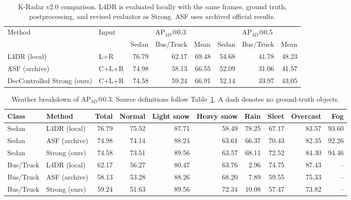 \begin{table}[t]
\centering
\small
\caption{K-Radar v2.0 comparison. L4DR is evaluated locally with the same frames, ground truth, postprocessing, and revised evaluator as Strong. ASF uses archived official results.}
\label{tab:kradar_v2_aligned}
\begin{tabular}{llrrrrrr}
\toprule
Method & Input & \multicolumn{3}{c}{AP$_{3D}$@0.3} & \multicolumn{3}{c}{AP$_{3D}$@0.5} \\
 & & Sedan & Bus/Truck & Mean & Sedan & Bus/Truck & Mean \\
\midrule
L4DR (local) & L+R & 76.79 & 62.17 & 69.48 & 54.68 & 41.78 & 48.23 \\
ASF (archive) & C+L+R & 74.98 & 58.13 & 66.55 & 52.09 & 31.06 & 41.57 \\
DecControlled Strong (ours) & C+L+R & 74.58 & 59.24 & 66.91 & 52.14 & 33.97 & 43.05 \\
\bottomrule
\end{tabular}
\end{table}

\begin{table}[t]
\centering
\scriptsize
\caption{Weather breakdown of AP$_{3D}$@0.3. Source definitions follow Table~\ref{tab:kradar_v2_aligned}. A dash denotes no ground-truth objects.}
\begin{tabular}{llrrrrrrrr}
\toprule
Class & Method & Total & Normal & Light snow & Heavy snow & Rain & Sleet & Overcast & Fog \\
\midrule
Sedan & L4DR (local) & 76.79 & 75.52 & 87.71 & 58.49 & 78.25 & 67.17 & 83.57 & 93.60 \\
Sedan & ASF (archive) & 74.98 & 74.14 & 88.24 & 63.61 & 66.37 & 70.43 & 82.35 & 92.26 \\
Sedan & Strong (ours) & 74.58 & 73.51 & 89.56 & 63.57 & 68.11 & 72.52 & 84.30 & 94.46 \\
Bus/Truck & L4DR (local) & 62.17 & 56.27 & 80.47 & 63.76 & 2.96 & 74.75 & 87.43 & -- \\
Bus/Truck & ASF (archive) & 58.13 & 53.28 & 88.26 & 68.20 & 7.89 & 59.55 & 75.33 & -- \\
Bus/Truck & Strong (ours) & 59.24 & 51.63 & 89.56 & 72.34 & 10.08 & 57.47 & 73.82 & -- \\
\bottomrule
\end{tabular}
\end{table}

